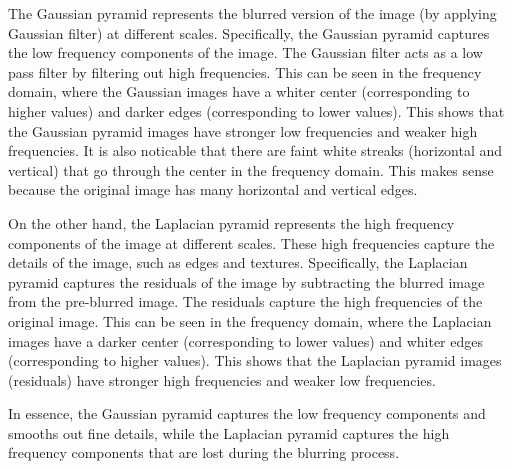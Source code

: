 \documentclass[12pt]{article}
\begin{document}
The Gaussian pyramid represents the blurred version of the image (by applying Gaussian filter) at different scales. Specifically, the Gaussian pyramid captures the low frequency components of the image. The Gaussian filter acts as a low pass filter by filtering out high frequencies. This can be seen in the frequency domain, where the Gaussian images have a whiter center (corresponding to higher values) and darker edges (corresponding to lower values). This shows that the Gaussian pyramid images have stronger low frequencies and weaker high frequencies. It is also noticable that there are faint white streaks (horizontal and vertical) that go through the center in the frequency domain. This makes sense because the original image has many horizontal and vertical edges.

On the other hand, the Laplacian pyramid represents the high frequency components of the image at different scales. These high frequencies capture the details of the image, such as edges and textures. Specifically, the Laplacian pyramid captures the residuals of the image by subtracting the blurred image from the pre-blurred image. The residuals capture the high frequencies of the original image. This can be seen in the frequency domain, where the Laplacian images have a darker center (corresponding to lower values) and whiter edges (corresponding to higher values). This shows that the Laplacian pyramid images (residuals) have stronger high frequencies and weaker low frequencies.

In essence, the Gaussian pyramid captures the low frequency components and smooths out fine details, while the Laplacian pyramid captures the high frequency components that are lost during the blurring process.
\end{document}
